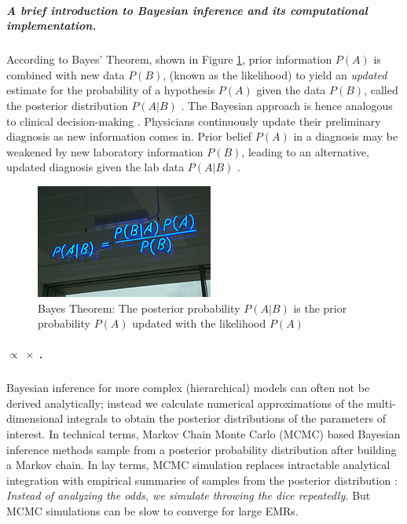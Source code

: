 \documentclass[11pt,notitlepage]{article}
\begin{document}
\subparagraph*{A brief introduction to Bayesian inference and its computational implementation.}

According to Bayes' Theorem, shown in Figure \ref{fig:BayesTheorem}, prior information $P(A)$ is combined with new data $P(B)$, (known as the likelihood) to yield an \textit{updated} estimate for the probability of a hypothesis $P(A)$ given the data $P(B)$, called the posterior distribution $P(A|B)$ \cite{Kruschke_Book_2014}. The Bayesian approach is hence analogous to clinical decision-making \cite{Spiegelhalter_11134920}. Physicians continuously update their preliminary diagnosis as new information comes in. Prior belief $P(A)$ in a diagnosis may be weakened by new laboratory information $P(B)$, leading to an alternative, updated diagnosis given the lab data $P(A|B)$ \cite{Kruschke_22774788}. 

\begin{figure} %
 \vspace{-10pt}
 \includegraphics[scale=0.6]{Figures/BayesTheorem.jpg} 
  \vspace{-20pt}
 \caption{\footnotesize Bayes Theorem: The posterior probability $P(A|B)$ is the prior probability $P(A)$ updated with the  likelihood $P(A)$}
 \vspace{-10pt}
 \label{fig:BayesTheorem}
\end{figure}

\subparagraph*{ $\propto$  $\times$ .}

Bayesian inference for more complex (hierarchical) models can often not be derived analytically; instead we calculate numerical approximations of the multi-dimensional integrals to obtain the posterior distributions of the parameters of interest. In technical terms, Markov Chain Monte Carlo (MCMC) based Bayesian inference methods sample from a posterior probability distribution after building a Markov chain. In lay terms, MCMC simulation replaces intractable analytical integration with empirical summaries of samples from the posterior distribution \cite{Abrams_9483729}: \textit{Instead of analyzing the odds, we simulate throwing the dice repeatedly.} But MCMC simulations can be slow to converge for large EMRs.
\end{document}
